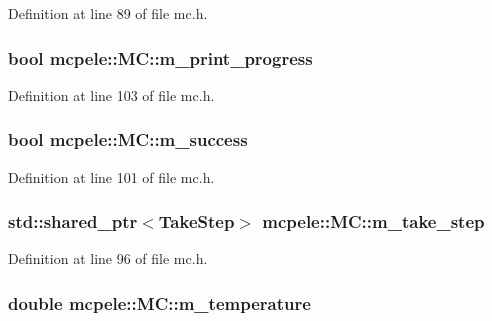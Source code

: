 \-Definition at line 89 of file mc.\-h.

\hypertarget{classmcpele_1_1MC_adca6168469b1bac463443a81ae8dde05}{
\subsubsection[{m\-\_\-print\-\_\-progress}]{\setlength{\rightskip}{0pt plus 5cm}bool {\bf mcpele\-::\-M\-C\-::m\-\_\-print\-\_\-progress}}}\label{classmcpele_1_1MC_adca6168469b1bac463443a81ae8dde05}


\-Definition at line 103 of file mc.\-h.

\hypertarget{classmcpele_1_1MC_ad31e9ad1eca13c1826461ceb915bad23}{
\subsubsection[{m\-\_\-success}]{\setlength{\rightskip}{0pt plus 5cm}bool {\bf mcpele\-::\-M\-C\-::m\-\_\-success}}}\label{classmcpele_1_1MC_ad31e9ad1eca13c1826461ceb915bad23}


\-Definition at line 101 of file mc.\-h.

\hypertarget{classmcpele_1_1MC_a3d1e08b4757ebbeab14b523b8cecbc54}{
\subsubsection[{m\-\_\-take\-\_\-step}]{\setlength{\rightskip}{0pt plus 5cm}std\-::shared\-\_\-ptr$<${\bf \-Take\-Step}$>$ {\bf mcpele\-::\-M\-C\-::m\-\_\-take\-\_\-step}}}\label{classmcpele_1_1MC_a3d1e08b4757ebbeab14b523b8cecbc54}


\-Definition at line 96 of file mc.\-h.

\hypertarget{classmcpele_1_1MC_ac96652882e0e578172de302578be5b88}{
\subsubsection[{m\-\_\-temperature}]{\setlength{\rightskip}{0pt plus 5cm}double {\bf mcpele\-::\-M\-C\-::m\-\_\-temperature}}}\label{classmcpele_1_1MC_ac96652882e0e578172de302578be5b88}


